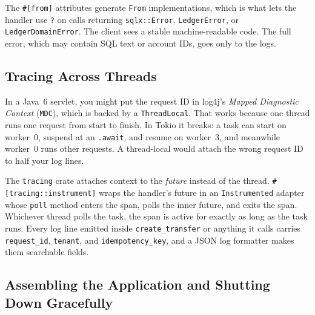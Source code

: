 The \texttt{\#[from]} attributes generate \texttt{From} implementations, which is what lets the handler use \texttt{?} on calls returning \texttt{sqlx::Error}, \texttt{LedgerError}, or \texttt{LedgerDomainError}. The client sees a stable machine-readable code. The full error, which may contain SQL text or account IDs, goes only to the logs.

\subsection{Tracing Across Threads}

In a Java~6 servlet, you might put the request ID in log4j's \emph{Mapped Diagnostic Context} (\texttt{MDC}), which is backed by a \texttt{ThreadLocal}. That works because one thread runs one request from start to finish. In Tokio it breaks: a task can start on worker~0, suspend at an \texttt{.await}, and resume on worker~3, and meanwhile worker~0 runs other requests. A thread-local would attach the wrong request ID to half your log lines.

The \texttt{tracing} crate attaches context to the \emph{future} instead of the thread. \texttt{\#[tracing::instrument]} wraps the handler's future in an \texttt{Instrumented} adapter whose \texttt{poll} method enters the span, polls the inner future, and exits the span. Whichever thread polls the task, the span is active for exactly as long as the task runs. Every log line emitted inside \texttt{create\_transfer} or anything it calls carries \texttt{request\_id}, \texttt{tenant}, and \texttt{idempotency\_key}, and a JSON log formatter makes them searchable fields.

\subsection{Assembling the Application and Shutting Down Gracefully}

